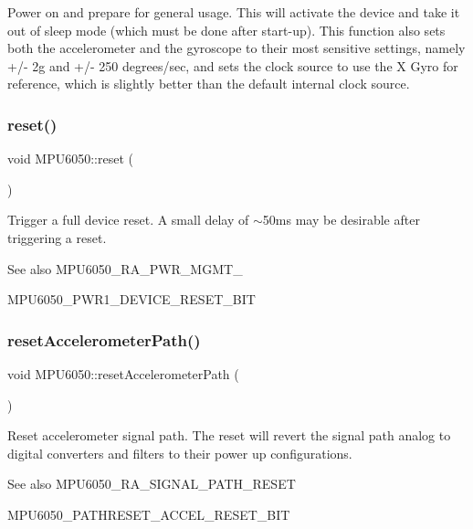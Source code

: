 Power on and prepare for general usage. This will activate the device and take it out of sleep mode (which must be done after start-\/up). This function also sets both the accelerometer and the gyroscope to their most sensitive settings, namely +/-\/ 2g and +/-\/ 250 degrees/sec, and sets the clock source to use the X Gyro for reference, which is slightly better than the default internal clock source. \mbox{\label{class_m_p_u6050_a7100b6d276c3c8664cf00d768b7b0dee}} 
\subsubsection{\texorpdfstring{reset()}{reset()}}
{\footnotesize\ttfamily void M\+P\+U6050\+::reset (\begin{DoxyParamCaption}{ }\end{DoxyParamCaption})}

Trigger a full device reset. A small delay of $\sim$50ms may be desirable after triggering a reset. \begin{DoxySeeAlso}{See also}
M\+P\+U6050\+\_\+\+R\+A\+\_\+\+P\+W\+R\+\_\+\+M\+G\+M\+T\+\_ 

M\+P\+U6050\+\_\+\+P\+W\+R1\+\_\+\+D\+E\+V\+I\+C\+E\+\_\+\+R\+E\+S\+E\+T\+\_\+\+B\+IT 
\end{DoxySeeAlso}
\mbox{\label{class_m_p_u6050_a99ee74708c12f32e48ef5ec69ac9f4a9}} 
\subsubsection{\texorpdfstring{resetAccelerometerPath()}{resetAccelerometerPath()}}
{\footnotesize\ttfamily void M\+P\+U6050\+::reset\+Accelerometer\+Path (\begin{DoxyParamCaption}{ }\end{DoxyParamCaption})}

Reset accelerometer signal path. The reset will revert the signal path analog to digital converters and filters to their power up configurations. \begin{DoxySeeAlso}{See also}
M\+P\+U6050\+\_\+\+R\+A\+\_\+\+S\+I\+G\+N\+A\+L\+\_\+\+P\+A\+T\+H\+\_\+\+R\+E\+S\+ET 

M\+P\+U6050\+\_\+\+P\+A\+T\+H\+R\+E\+S\+E\+T\+\_\+\+A\+C\+C\+E\+L\+\_\+\+R\+E\+S\+E\+T\+\_\+\+B\+IT 
\end{DoxySeeAlso}
\mbox{\label{class_m_p_u6050_aafa0dc38b7ea2acd1aecd5d9df8cbd08}} 
